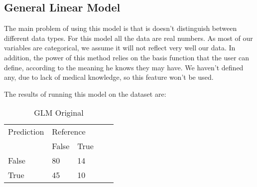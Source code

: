 



\subsection{General Linear Model}

The main problem of using this model is that is doesn't distinguish between different data types. For this model all the data are real numbers. As most of our variables are categorical, we assume it will not reflect very well our data. In addition, the power of this method relies on the basis function that the user can define, according to the meaning he knows they may have. We haven't defined any, due to lack of medical knowledge, so this feature won't be used.


The results of running this model on the dataset are:

\begin{table}[!htbp]
\centering
\caption{GLM Original}
\vspace{0.1cm}
\label{glm-orig}
\begin{tabular}{|l|ll|ll}
\cline{1-3}
Prediction & \multicolumn{2}{l|}{Reference} &  &  \\
           & False          & True          &  &  \\ \cline{2-3}
False      & 80              & 14             &  &  \\
True       & 45              & 10             &  &  \\ \cline{1-3}
\end{tabular}
\end{table}

